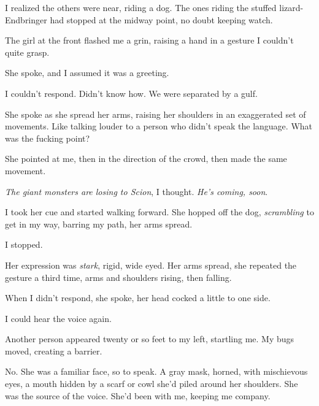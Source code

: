 I realized the others were near, riding a dog.  The ones riding the stuffed lizard-Endbringer had stopped at the midway point, no doubt keeping watch.



The girl at the front flashed me a grin, raising a hand in a gesture I couldn't quite grasp.



She spoke, and I assumed it was a greeting.



I couldn't respond.  Didn't know how.  We were separated by a gulf.



She spoke as she spread her arms, raising her shoulders in an exaggerated set of movements.  Like talking louder to a person who didn't speak the language.  What was the fucking point?



She pointed at me, then in the direction of the crowd, then made the same movement.



\emph{The giant monsters are losing to Scion}, I thought.  \emph{He's coming, soon}.



I took her cue and started walking forward.  She hopped off the dog, \emph{scrambling }to get in my way, barring my path, her arms spread.



I stopped.



Her expression was \emph{stark}, rigid, wide eyed.  Her arms spread, she repeated the gesture a third time, arms and shoulders rising, then falling.



When I didn't respond, she spoke, her head cocked a little to one side.



I could hear the voice again.



Another person appeared twenty or so feet to my left, startling me.  My bugs moved, creating a barrier.



No.  She was a familiar face, so to speak.  A gray mask, horned, with mischievous eyes, a mouth hidden by a scarf or cowl  she'd piled around her shoulders.  She was the source of the voice.  She'd been with me, keeping me company.



